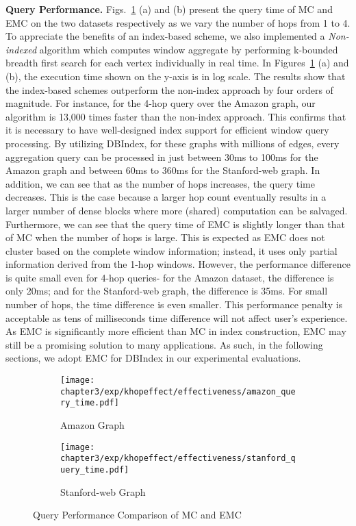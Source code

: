 \textbf{Query Performance.}       
Figs.~\ref{fig:khop_effective_query_time} (a) and (b)
present the query time of MC and EMC 
on the two datasets respectively 
as we vary the number of hops from 1 to 4.
To appreciate the benefits of an index-based scheme, we also implemented
a \emph{Non-indexed} algorithm which computes window aggregate by performing k-bounded breadth
first search for each vertex individually in real time.
In Figures~\ref{fig:khop_effective_query_time} (a) and (b),
the execution time shown on the y-axis is in log scale. The results show that the index-based 
schemes outperform the non-index approach by four orders of magnitude. 
For instance, for the 4-hop query over the Amazon graph, 
our algorithm is 13,000 times faster than the non-index approach. 
This confirms that it is necessary to have well-designed index support 
for efficient window query processing. By utilizing DBIndex, 
for these graphs with millions of edges, every aggregation query 
can be processed in just between 30ms to 100ms for the Amazon graph and 
between 60ms to 360ms for the Stanford-web graph. In addition, we can 
see that as the number of hops increases, the query time decreases. 
This is the case because a larger hop count eventually results in a larger
number of dense blocks where more (shared) computation can be salvaged. 
Furthermore, we can see that the query time of EMC is slightly longer 
than that of MC when the number of hops is large. This is expected as 
EMC does not cluster based on the complete window information; instead, it
uses only partial information derived from the 1-hop windows. 
However, the performance difference is quite small even for 4-hop queries- for
the Amazon dataset, the difference is only 20ms; and for the Stanford-web
graph, the difference is 35ms. 
For small number of hops, the time difference is even smaller. 
This performance penalty is acceptable as tens of milliseconds time 
difference will not affect user's experience.  As EMC is significantly more 
efficient than MC in index construction, EMC may still be a 
promising solution to many applications. As such, 
in the following sections, we adopt EMC for DBIndex in
our experimental evaluations.  
 
\begin{figure}[h]
\centering
\begin{subfigure}{0.48\linewidth}
\centering
  \texttt{[image: chapter3/exp/khopeffect/effectiveness/amazon\_query\_time.pdf]}
  \caption{Amazon Graph}
\end{subfigure}%
\begin{subfigure}{0.48\linewidth}
\centering
  \texttt{[image: chapter3/exp/khopeffect/effectiveness/stanford\_query\_time.pdf]}
  \caption{Stanford-web Graph}
\end{subfigure}
\caption{Query Performance Comparison of MC and EMC}
\label{fig:khop_effective_query_time}
\end{figure}

